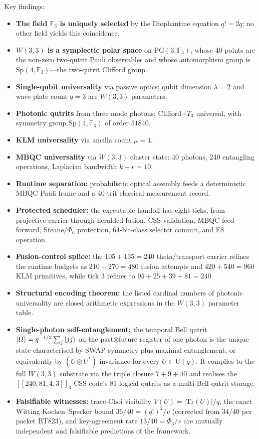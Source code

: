﻿\documentclass[12pt]{article}
\newcommand{\FF}{\mathbb{F}}
\newcommand{\Sp}{\mathrm{Sp}}
\newcommand{\GF}[1]{\mathbb{F}_{#1}}
\newcommand{\PG}[2]{\mathrm{PG}(#1,#2)}
\begin{document}
Key findings:
\begin{itemize}[noitemsep]
  \item \textbf{The field $\GF{3}$ is uniquely selected} by the Diophantine equation
    $q! = 2q$; no other field yields this coincidence.
  \item \textbf{$W(3,3)$ is a symplectic polar space} on $\PG{3}{\GF{3}}$, whose 40
    points are the non-zero two-qutrit Pauli observables and whose automorphism group
    is $\Sp(4,\FF_3)$---the two-qutrit Clifford group.
  \item \textbf{Single-qubit universality} via passive optics; qubit dimension
    $\lambda=2$ and wave-plate count $q=3$ are $W(3,3)$ parameters.
  \item \textbf{Photonic qutrits} from three-mode photons; Clifford$+T_3$ universal,
    with symmetry group $\Sp(4,\FF_3)$ of order $51840$.
  \item \textbf{KLM universality} via ancilla count $\mu=4$.
  \item \textbf{MBQC universality} via $W(3,3)$ cluster state: 40 photons, 240
    entangling operations, Laplacian bandwidth $k - r = 10$.
  \item \textbf{Runtime separation:} probabilistic optical assembly feeds a
    deterministic MBQC Pauli frame and a 40-trit classical measurement record.
  \item \textbf{Protected scheduler:} the executable handoff has eight ticks, from
    projective carrier through heralded fusion, CSS validation, MBQC feed-forward,
    Steane/$\Phi_6$ protection, 64-bit-class selector commit, and E8 operation.
  \item \textbf{Fusion-control splice:} the \(105+135=240\) theta/transport carrier
    refines the runtime budgets as \(210+270=480\) fusion attempts and
    \(420+540=960\) KLM primitives, while tick 3 refines to
    \(95+25+39+81=240\).
  \item \textbf{Structural encoding theorem:} the listed cardinal numbers of
    photonic universality are closed arithmetic expressions in the $W(3,3)$
    parameter table.
  \item \textbf{Single-photon self-entanglement:} the temporal Bell qutrit
    $\ket{\Omega} = q^{-1/2}\sum_j\ket{jj}$ on the past$\otimes$future
    register of one photon is the unique state characterised by
    SWAP-symmetry plus maximal entanglement, or equivalently by
    $(U\otimes U^*)$ invariance for every $U\in\mathrm{U}(q)$.  It compiles
    to the full $W(3,3)$ substrate via the triple closure $7 + 9 + 40$ and
    realises the $[[240,81,4,3]]_3$ CSS code's 81 logical qutrits as a
    multi-Bell-qutrit storage.
  \item \textbf{Falsifiable witnesses:} trace-Choi visibility $V(U) =
    |\mathrm{Tr}(U)|/q$, the exact Witting Kochen--Specker bound
    $36/40 = (q!)^2/v$ (corrected from $34/40$ per packet BT823), and
    key-agreement rate $13/40 = \Phi_3/v$ are mutually independent and
    falsifiable predictions of the framework.
\end{itemize}
\end{document}
